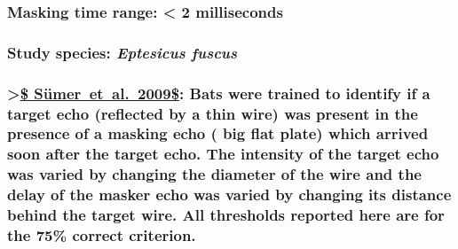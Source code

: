 \documentclass[11pt]{article}
\begin{document}
\hypertarget{masking-time-range-2-milliseconds}{%
\subsubsection{Masking time range: \textless{} 2
milliseconds}\label{masking-time-range-2-milliseconds}}

\hypertarget{study-species-eptesicus-fuscus}{%
\subsubsection{\texorpdfstring{Study species: \emph{Eptesicus
fuscus}}{Study species: Eptesicus fuscus}}\label{study-species-eptesicus-fuscus}}

\hypertarget{suxfcmeretal.2009-bats-were-trained-to-identify-if-a-target-echo-reflected-by-a-thin-wire-was-present-in-the-presence-of-a-masking-echo-big-flat-plate-which-arrived-soon-after-the-target-echo.-the-intensity-of-the-target-echo-was-varied-by-changing-the-diameter-of-the-wire-and-the-delay-of-the-masker-echo-was-varied-by-changing-its-distance-behind-the-target-wire.-all-thresholds-reported-here-are-for-the-75-correct-criterion.}{%
\subsubsection{\texorpdfstring{\textgreater{}\href{https://link.springer.com/article/10.1007/s00359-009-0424-9}{\$
Sümer~et~al.~2009\$}: Bats were trained to identify if a target echo
(reflected by a thin wire) was present in the presence of a masking echo
( big flat plate) which arrived soon after the target echo. The
intensity of the target echo was varied by changing the diameter of the
wire and the delay of the masker echo was varied by changing its
distance behind the target wire. All thresholds reported here are for
the 75\% correct
criterion.}{\textgreater{}\$ Sümer~et~al.~2009\$: Bats were trained to identify if a target echo (reflected by a thin wire) was present in the presence of a masking echo ( big flat plate) which arrived soon after the target echo. The intensity of the target echo was varied by changing the diameter of the wire and the delay of the masker echo was varied by changing its distance behind the target wire. All thresholds reported here are for the 75\% correct criterion.}}\label{suxfcmeretal.2009-bats-were-trained-to-identify-if-a-target-echo-reflected-by-a-thin-wire-was-present-in-the-presence-of-a-masking-echo-big-flat-plate-which-arrived-soon-after-the-target-echo.-the-intensity-of-the-target-echo-was-varied-by-changing-the-diameter-of-the-wire-and-the-delay-of-the-masker-echo-was-varied-by-changing-its-distance-behind-the-target-wire.-all-thresholds-reported-here-are-for-the-75-correct-criterion.}}
\end{document}
